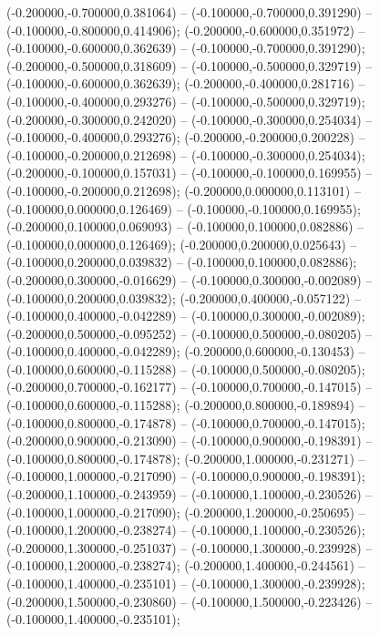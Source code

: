  (-0.200000,-0.700000,0.381064) -- (-0.100000,-0.700000,0.391290) -- (-0.100000,-0.800000,0.414906);
 (-0.200000,-0.600000,0.351972) -- (-0.100000,-0.600000,0.362639) -- (-0.100000,-0.700000,0.391290);
 (-0.200000,-0.500000,0.318609) -- (-0.100000,-0.500000,0.329719) -- (-0.100000,-0.600000,0.362639);
 (-0.200000,-0.400000,0.281716) -- (-0.100000,-0.400000,0.293276) -- (-0.100000,-0.500000,0.329719);
 (-0.200000,-0.300000,0.242020) -- (-0.100000,-0.300000,0.254034) -- (-0.100000,-0.400000,0.293276);
 (-0.200000,-0.200000,0.200228) -- (-0.100000,-0.200000,0.212698) -- (-0.100000,-0.300000,0.254034);
 (-0.200000,-0.100000,0.157031) -- (-0.100000,-0.100000,0.169955) -- (-0.100000,-0.200000,0.212698);
 (-0.200000,0.000000,0.113101) -- (-0.100000,0.000000,0.126469) -- (-0.100000,-0.100000,0.169955);
 (-0.200000,0.100000,0.069093) -- (-0.100000,0.100000,0.082886) -- (-0.100000,0.000000,0.126469);
 (-0.200000,0.200000,0.025643) -- (-0.100000,0.200000,0.039832) -- (-0.100000,0.100000,0.082886);
 (-0.200000,0.300000,-0.016629) -- (-0.100000,0.300000,-0.002089) -- (-0.100000,0.200000,0.039832);
 (-0.200000,0.400000,-0.057122) -- (-0.100000,0.400000,-0.042289) -- (-0.100000,0.300000,-0.002089);
 (-0.200000,0.500000,-0.095252) -- (-0.100000,0.500000,-0.080205) -- (-0.100000,0.400000,-0.042289);
 (-0.200000,0.600000,-0.130453) -- (-0.100000,0.600000,-0.115288) -- (-0.100000,0.500000,-0.080205);
 (-0.200000,0.700000,-0.162177) -- (-0.100000,0.700000,-0.147015) -- (-0.100000,0.600000,-0.115288);
 (-0.200000,0.800000,-0.189894) -- (-0.100000,0.800000,-0.174878) -- (-0.100000,0.700000,-0.147015);
 (-0.200000,0.900000,-0.213090) -- (-0.100000,0.900000,-0.198391) -- (-0.100000,0.800000,-0.174878);
 (-0.200000,1.000000,-0.231271) -- (-0.100000,1.000000,-0.217090) -- (-0.100000,0.900000,-0.198391);
 (-0.200000,1.100000,-0.243959) -- (-0.100000,1.100000,-0.230526) -- (-0.100000,1.000000,-0.217090);
 (-0.200000,1.200000,-0.250695) -- (-0.100000,1.200000,-0.238274) -- (-0.100000,1.100000,-0.230526);
 (-0.200000,1.300000,-0.251037) -- (-0.100000,1.300000,-0.239928) -- (-0.100000,1.200000,-0.238274);
 (-0.200000,1.400000,-0.244561) -- (-0.100000,1.400000,-0.235101) -- (-0.100000,1.300000,-0.239928);
 (-0.200000,1.500000,-0.230860) -- (-0.100000,1.500000,-0.223426) -- (-0.100000,1.400000,-0.235101);
